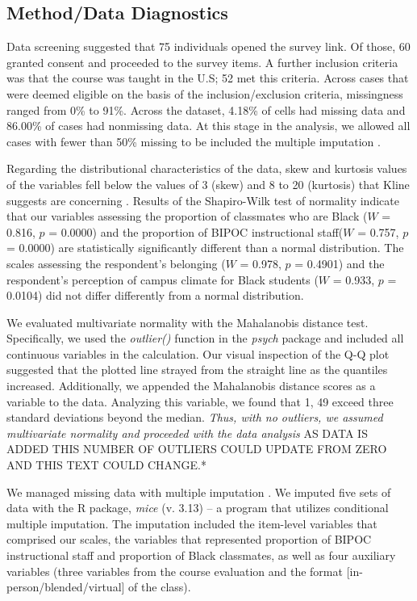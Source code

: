 \documentclass[
  11pt,
]{book}
\begin{document}
\hypertarget{methoddata-diagnostics}{%
\subsection{Method/Data Diagnostics}\label{methoddata-diagnostics}}

Data screening suggested that 75 individuals opened the survey link. Of those, 60 granted consent and proceeded to the survey items. A further inclusion criteria was that the course was taught in the U.S; 52 met this criteria. Across cases that were deemed eligible on the basis of the inclusion/exclusion criteria, missingness ranged from 0\% to 91\%. Across the dataset, 4.18\% of cells had missing data and 86.00\% of cases had nonmissing data. At this stage in the analysis, we allowed all cases with fewer than 50\% missing to be included the multiple imputation \citep{katitas_getting_2019}.

Regarding the distributional characteristics of the data, skew and kurtosis values of the variables fell below the values of 3 (skew) and 8 to 20 (kurtosis) that Kline suggests are concerning \citeyearpar{kline_principles_2016}. Results of the Shapiro-Wilk test of normality indicate that our variables assessing the proportion of classmates who are Black (\(W\) = 0.816, \(p\) = 0.0000) and the proportion of BIPOC instructional staff(\(W\) = 0.757, \(p\) = 0.0000) are statistically significantly different than a normal distribution. The scales assessing the respondent's belonging (\(W\) = 0.978, \(p\) = 0.4901) and the respondent's perception of campus climate for Black students (\(W\) = 0.933, \(p\) = 0.0104) did not differ differently from a normal distribution.

We evaluated multivariate normality with the Mahalanobis distance test. Specifically, we used the \emph{outlier()} function in the \emph{psych} package and included all continuous variables in the calculation. Our visual inspection of the Q-Q plot suggested that the plotted line strayed from the straight line as the quantiles increased. Additionally, we appended the Mahalanobis distance scores as a variable to the data. Analyzing this variable, we found that 1, 49 exceed three standard deviations beyond the median. \emph{Thus, with no outliers, we assumed multivariate normality and proceeded with the data analysis} AS DATA IS ADDED THIS NUMBER OF OUTLIERS COULD UPDATE FROM ZERO AND THIS TEXT COULD CHANGE.*

We managed missing data with multiple imputation \citep{enders_multiple_2017, katitas_getting_2019}. We imputed five sets of data with the R package, \emph{mice} (v. 3.13) -- a program that utilizes conditional multiple imputation. The imputation included the item-level variables that comprised our scales, the variables that represented proportion of BIPOC instructional staff and proportion of Black classmates, as well as four auxiliary variables (three variables from the course evaluation and the format {[}in-person/blended/virtual{]} of the class).
\end{document}
